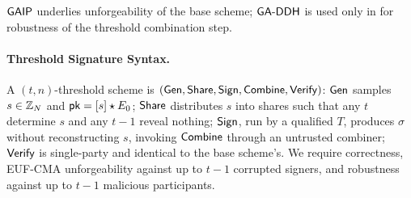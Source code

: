 $\mathsf{GAIP}$ underlies unforgeability of the base scheme; $\mathsf{GA\text{-}DDH}$ is used only in  for robustness of the threshold combination step.

\paragraph{Threshold Signature Syntax.}
A $(t,n)$-threshold scheme is $(\mathsf{Gen},\mathsf{Share},\mathsf{Sign},\mathsf{Combine},\mathsf{Verify})$: $\mathsf{Gen}$ samples $s \in \mathbb{Z}_N$ and $\mathsf{pk} = [s]\star E_0$; $\mathsf{Share}$ distributes $s$ into shares such that any $t$ determine $s$ and any $t{-}1$ reveal nothing; $\mathsf{Sign}$, run by a qualified $T$, produces $\sigma$ without reconstructing $s$, invoking $\mathsf{Combine}$ through an untrusted combiner; $\mathsf{Verify}$ is single-party and identical to the base scheme's. We require correctness, EUF-CMA unforgeability against up to $t{-}1$ corrupted signers, and robustness against up to $t{-}1$ malicious participants.
